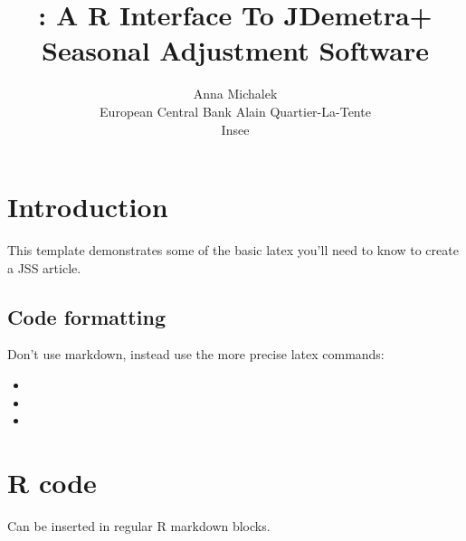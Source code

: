 \documentclass[article]{jss}
\author{
Anna Michalek\\European Central Bank \And Alain Quartier-La-Tente\\Insee
}
\title{\pkg{RJDemetra}: A R Interface To JDemetra+ Seasonal Adjustment Software}
\begin{document}
\hypertarget{introduction}{%
\section{Introduction}\label{introduction}}

This template demonstrates some of the basic latex you'll need to know
to create a JSS article.

\hypertarget{code-formatting}{%
\subsection{Code formatting}\label{code-formatting}}

Don't use markdown, instead use the more precise latex commands:

\begin{itemize}
\item
\item
\item
\end{itemize}

\hypertarget{r-code}{%
\section{R code}\label{r-code}}

Can be inserted in regular R markdown blocks.
\end{document}
